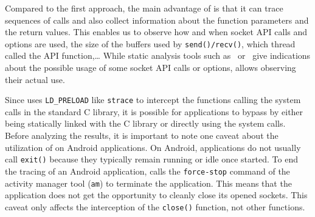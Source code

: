 Compared to the first approach, the main advantage of \tcpsnitch is
that it can trace sequences of calls and also collect information
about the function parameters and the return values. This enables us
to observe how and when socket API calls and options are used, the size of the
buffers used by \texttt{send()/recv()}, which thread called the API function,\ldots
While static analysis tools such as~\cite{Komu:Sockets} or~\cite{Tsai:LinuxAPI}
give indications about the possible usage of some socket API calls or options,
\tcpsnitch allows observing their actual use.

Since \tcpsnitch uses \texttt{LD\_PRELOAD} like \texttt{strace} to intercept
the functions calling the system calls in the standard
C library, it is possible for applications to bypass \tcpsnitch by
either being statically linked with the C library or directly using
the system calls. Before analyzing the results, it is important 
to note one caveat about the utilization of
\tcpsnitch on Android applications. On Android,
applications do not usually call \texttt{exit()} because they typically
remain running or idle once started. To end the tracing of an Android application,
\tcpsnitch calls the \texttt{force-stop} command of the activity
manager tool (\texttt{am}) to terminate the application. This means
that the application does not get the opportunity to cleanly close its
opened sockets. This caveat only affects the interception of the
\texttt{close()} function, not other functions.

